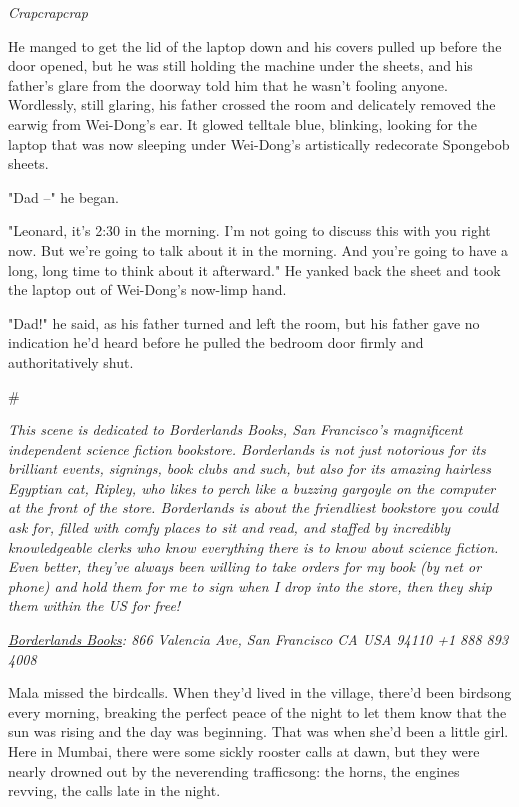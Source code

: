 \emph{Crapcrapcrap}

He manged to get the lid of the laptop down and his covers pulled
up before the door opened, but he was still holding the machine
under the sheets, and his father's glare from the doorway told him
that he wasn't fooling anyone. Wordlessly, still glaring, his
father crossed the room and delicately removed the earwig from
Wei-Dong's ear. It glowed telltale blue, blinking, looking for the
laptop that was now sleeping under Wei-Dong's artistically
redecorate Spongebob sheets.

"Dad --" he began.

"Leonard, it's 2:30 in the morning. I'm not going to discuss this
with you right now. But we're going to talk about it in the
morning. And you're going to have a long, long time to think about
it afterward." He yanked back the sheet and took the laptop out of
Wei-Dong's now-limp hand.

"Dad!" he said, as his father turned and left the room, but his
father gave no indication he'd heard before he pulled the bedroom
door firmly and authoritatively shut.

\#

\emph{This scene is dedicated to Borderlands Books, San Francisco's magnificent independent science fiction bookstore. Borderlands is not just notorious for its brilliant events, signings, book clubs and such, but also for its amazing hairless Egyptian cat, Ripley, who likes to perch like a buzzing gargoyle on the computer at the front of the store. Borderlands is about the friendliest bookstore you could ask for, filled with comfy places to sit and read, and staffed by incredibly knowledgeable clerks who know everything there is to know about science fiction. Even better, they've always been willing to take orders for my book (by net or phone) and hold them for me to sign when I drop into the store, then they ship them within the US for free!}

\emph{\href{http://www.borderlands-books.com/}{Borderlands Books}: 866 Valencia Ave, San Francisco CA USA 94110 +1 888 893 4008}

Mala missed the birdcalls. When they'd lived in the village,
there'd been birdsong every morning, breaking the perfect peace of
the night to let them know that the sun was rising and the day was
beginning. That was when she'd been a little girl. Here in Mumbai,
there were some sickly rooster calls at dawn, but they were nearly
drowned out by the neverending trafficsong: the horns, the engines
revving, the calls late in the night.

